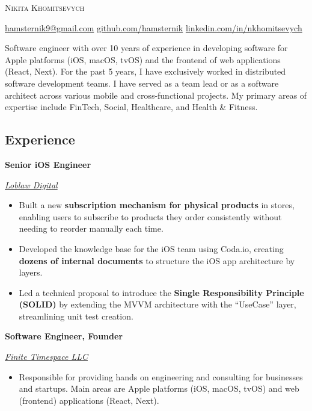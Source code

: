 \documentclass[10pt]{article}
\newcommand{\SectionSpacing}{ %
    \vspace*{1em}
}
\newcommand{\SubSectionSpacing}{
    \vspace*{0.5em}
}
\newcommand{\Experience}[3]{%
    \noindent \textbf{#1}
    \hfill \text{#2} \par
    \noindent \textit{#3} \par
    \normalsize \normalfont \par
}
\begin{document}
\textsc{\huge{Nikita Khomitsevych}}

\SectionSpacing

\noindent
\href{mailto:hamsternik9@gmail.com}{hamsternik9@gmail.com} \text{\textbar}
\href{https://github.com/hamsternik}{github.com/hamsternik} \text{\textbar}
\href{https://www.linkedin.com/in/nkhomitsevych/}{linkedin.com/in/nkhomitsevych}

\SectionSpacing

\noindent
Software engineer with over 10 years of experience in developing software for Apple platforms (iOS, macOS, tvOS) and the frontend of web applications (React, Next).
For the past 5 years, I have exclusively worked in distributed software development teams. 
I have served as a team lead or as a software architect across various mobile and cross-functional projects. 
My primary areas of expertise include FinTech, Social, Healthcare, and Health \& Fitness.


\subsection*{Experience}

\Experience
{Senior iOS Engineer}
{Jul 2024 -- Jan 2025}
{\href{https://www.loblawdigital.co}{Loblaw Digital}}

\noindent
\begin{itemize}[label=-]
  \setlength\itemsep{0cm}
  \item Built a new \textbf{subscription mechanism for physical products} in stores, enabling users to subscribe to products they order consistently without needing to reorder manually each time.
  \item Developed the knowledge base for the iOS team using Coda.io, creating \textbf{dozens of internal documents} to structure the iOS app architecture by layers. 
  \item Led a technical proposal to introduce the \textbf{Single Responsibility Principle (SOLID)} by extending the MVVM architecture with the “UseCase” layer, streamlining unit test creation. 
\end{itemize}

\SubSectionSpacing

\Experience
{Software Engineer, Founder}
{Dec 2023 -- Present}
{\href{https://finitetimespace.com}{Finite Timespace LLC}}

\noindent
\begin{itemize}[label=-]
    \setlength\itemsep{0cm}
    \item Responsible for providing hands on engineering and consulting for businesses and startups. 
      Main areas are Apple platforms (iOS, macOS, tvOS) and web (frontend) applications (React, Next).
\end{itemize}
\end{document}
